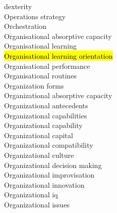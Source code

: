\documentclass[a4paper]{article}
\begin{document}
\begin{multicols*}{2}
\begin{footnotesize}
dexterity \\ Operations strategy \\ Orchestration \\ Organisational absorptive capacity \\ Organisational learning \\ \hl{Organisational learning orientation} \\ Organisational performance \\ Organisational routines \\ Organization forms \\ Organizational absorptive capacity \\ Organizational antecedents \\ Organizational capabilities \\ Organizational capability \\ Organizational capital \\ Organizational compatibility \\ Organizational culture \\ Organizational decision making \\ Organizational improvisation \\ Organizational innovation \\ Organizational iq \\ Organizational issues \\
\end{footnotesize}
\end{multicols*}
\end{document}
